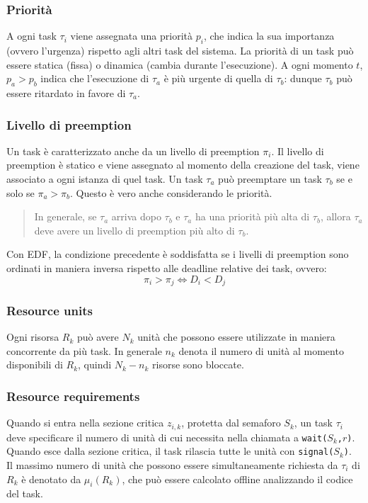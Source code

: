 \documentclass[12pt,openany,onesided]{book}
\begin{document}
\subsubsection{Priorità}
A ogni task $\tau_i$ viene assegnata una priorità $p_i$, che indica la sua importanza (ovvero l'urgenza) rispetto agli altri task del sistema.
La priorità di un task può essere statica (fissa) o dinamica (cambia durante l'esecuzione).
A ogni momento $t$, $p_a > p_b$ indica che l'esecuzione di $\tau_a$ è più urgente di quella di $\tau_b$: dunque $\tau_b$ può essere ritardato in favore di $\tau_a$.
\subsubsection{Livello di preemption}
Un task è caratterizzato anche da un livello di preemption $\pi_i$.
Il livello di preemption è statico e viene assegnato al momento della creazione del task, viene associato a ogni istanza di quel task.
Un task $\tau_a$ può preemptare un task $\tau_b$ se e solo se $\pi_a > \pi_b$. Questo è vero anche considerando le priorità.
\begin{quote}
In generale, se $\tau_a$ arriva dopo $\tau_b$ e $\tau_a$ ha una priorità più alta di $\tau_b$, allora $\tau_a$ deve avere un livello di preemption più alto di $\tau_b$.
\end{quote}
Con EDF, la condizione precedente è soddisfatta se i livelli di preemption sono ordinati in maniera inversa rispetto alle deadline relative dei task, ovvero:
\begin{equation*}
    \pi_i > \pi_j \iff D_i < D_j
\end{equation*}
\subsubsection{Resource units}
Ogni risorsa $R_k$ può avere $N_k$ unità che possono essere utilizzate in maniera concorrente da più task.
In generale $n_k$ denota il numero di unità al momento disponibili di $R_k$, quindi $N_k-n_k$ risorse sono bloccate.
\subsubsection{Resource requirements}
Quando si entra nella sezione critica $z_{i,k}$, protetta dal semaforo $S_k$, un task $\tau_i$ deve specificare il numero di unità di cui necessita nella chiamata a \texttt{wait($S_k$,$r$)}.
Quando esce dalla sezione critica, il task rilascia tutte le unità con \texttt{signal($S_k$)}.
\\
Il massimo numero di unità che possono essere simultaneamente richiesta da $\tau_i$ di $R_k$ è denotato da $\mu_i(R_k)$, che può essere calcolato offline analizzando il codice del task.
\end{document}
